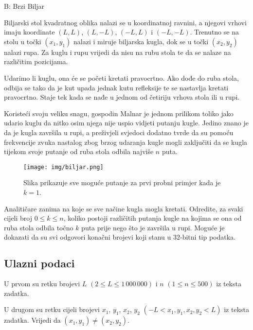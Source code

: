 \begin{statement}[
  timelimit=2 s,
  memorylimit=512 MiB,
]{B: Brzi Biljar}

Biljarski stol kvadratnog oblika nalazi se u koordinatnoj ravnini, a njegovi
vrhovi imaju koordinate $(L,L)$, $(L,-L)$, $(-L,L)$ i $(-L,-L)$. Trenutno se
na stolu u točki $(x_1, y_1)$ nalazi i miruje biljarska kugla, dok se u točki
$(x_2, y_2)$ nalazi rupa. Za kuglu i rupu vrijedi da nisu na rubu stola te da
se nalaze na različitim pozicijama.

Udarimo li kuglu, ona će se početi kretati pravocrtno. Ako dođe do ruba stola,
odbija se tako da je kut upada jednak kutu refleksije te se nastavlja kretati
pravocrtno. Staje tek kada se nađe u jednom od četiriju vrhova stola ili u
rupi.

Koristeći svoju veliku snagu, gospodin Malnar je jednom prilikom toliko jako
udario kuglu da nitko osim njega nije uspio vidjeti putanju kugle. Jedino
znano je da je kugla završila u rupi, a preživjeli svjedoci dodatno tvrde da
su pomoću frekvencije zvuka nastalog zbog brzog udaranja kugle mogli
zaključiti da se kugla tijekom svoje putanje od ruba stola odbila najviše $n$
puta.

\begin{figure}[h]
\centering
\texttt{[image: img/biljar.png]}
\caption{Slika prikazuje sve moguće putanje za prvi probni primjer kada je $k=1$.}
\end{figure}

Analitičare zanima na koje se sve načine kugla mogla kretati. Odredite, za
svaki cijeli broj $0 \le k \le n$, koliko postoji različitih putanja kugle na
kojima se ona od ruba stola odbila točno $k$ puta prije nego što je završila
u rupi. Moguće je dokazati da su svi odgovori konačni brojevi koji stanu u
$32$-bitni tip podatka.

\subsection*{Ulazni podaci}
U prvom su retku brojevi $L$ $(2 \le L \le 1\,000\,000)$ i $n$ $(1 \le n \le
500)$ iz teksta zadatka.

U drugom su retku cijeli brojevi $x_1$, $y_1$, $x_2$, $y_2$ $(-L < x_1,
y_1, x_2, y_2 < L)$ iz teksta zadatka. Vrijedi da $(x_1, y_1) \ne (x_2, y_2)$.


\end{statement}
